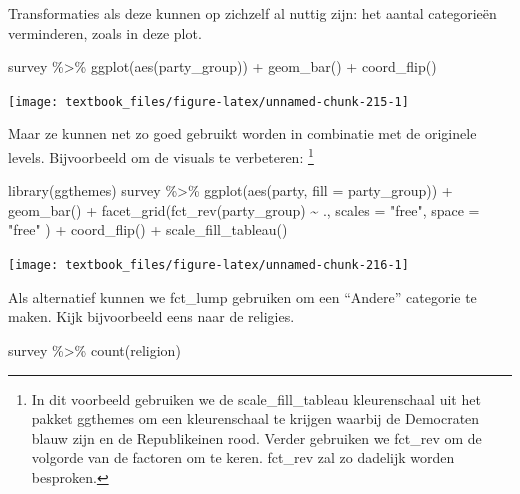 \documentclass[]{tufte-book}
\newenvironment{Shaded}{}{}
\newcommand{\AttributeTok}[1]{\textcolor[rgb]{0.49,0.56,0.16}{#1}}
\newcommand{\FunctionTok}[1]{\textcolor[rgb]{0.02,0.16,0.49}{#1}}
\newcommand{\NormalTok}[1]{#1}
\newcommand{\SpecialCharTok}[1]{\textcolor[rgb]{0.25,0.44,0.63}{#1}}
\newcommand{\StringTok}[1]{\textcolor[rgb]{0.25,0.44,0.63}{#1}}
\begin{document}
Transformaties als deze kunnen op zichzelf al nuttig zijn: het aantal categorieën verminderen, zoals in deze plot.

\begin{Shaded}
\begin{Highlighting}[]
\NormalTok{survey }\SpecialCharTok{\%\textgreater{}\%}
  \FunctionTok{ggplot}\NormalTok{(}\FunctionTok{aes}\NormalTok{(party\_group)) }\SpecialCharTok{+}
  \FunctionTok{geom\_bar}\NormalTok{() }\SpecialCharTok{+}
  \FunctionTok{coord\_flip}\NormalTok{()}
\end{Highlighting}
\end{Shaded}

\texttt{[image: textbook\_files/figure-latex/unnamed-chunk-215-1]}

Maar ze kunnen net zo goed gebruikt worden in combinatie met de originele levels. Bijvoorbeeld om de visuals te verbeteren: \footnote{In dit voorbeeld gebruiken we de scale\_fill\_tableau kleurenschaal uit het pakket ggthemes om een kleurenschaal te krijgen waarbij de Democraten blauw zijn en de Republikeinen rood. Verder gebruiken we fct\_rev om de volgorde van de factoren om te keren. fct\_rev zal zo dadelijk worden besproken.}

\begin{Shaded}
\begin{Highlighting}[]
\FunctionTok{library}\NormalTok{(ggthemes)}
\NormalTok{survey }\SpecialCharTok{\%\textgreater{}\%}
  \FunctionTok{ggplot}\NormalTok{(}\FunctionTok{aes}\NormalTok{(party, }\AttributeTok{fill =}\NormalTok{ party\_group)) }\SpecialCharTok{+}
  \FunctionTok{geom\_bar}\NormalTok{() }\SpecialCharTok{+}
  \FunctionTok{facet\_grid}\NormalTok{(}\FunctionTok{fct\_rev}\NormalTok{(party\_group) }\SpecialCharTok{\textasciitilde{}}\NormalTok{ .,}
    \AttributeTok{scales =} \StringTok{"free"}\NormalTok{, }\AttributeTok{space =} \StringTok{"free"}
\NormalTok{  ) }\SpecialCharTok{+}
  \FunctionTok{coord\_flip}\NormalTok{() }\SpecialCharTok{+}
  \FunctionTok{scale\_fill\_tableau}\NormalTok{()}
\end{Highlighting}
\end{Shaded}

\texttt{[image: textbook\_files/figure-latex/unnamed-chunk-216-1]}

Als alternatief kunnen we fct\_lump gebruiken om een ``Andere'' categorie te maken. Kijk bijvoorbeeld eens naar de religies.

\begin{Shaded}
\begin{Highlighting}[]
\NormalTok{survey }\SpecialCharTok{\%\textgreater{}\%}
  \FunctionTok{count}\NormalTok{(religion)}
\end{Highlighting}
\end{Shaded}
\end{document}

